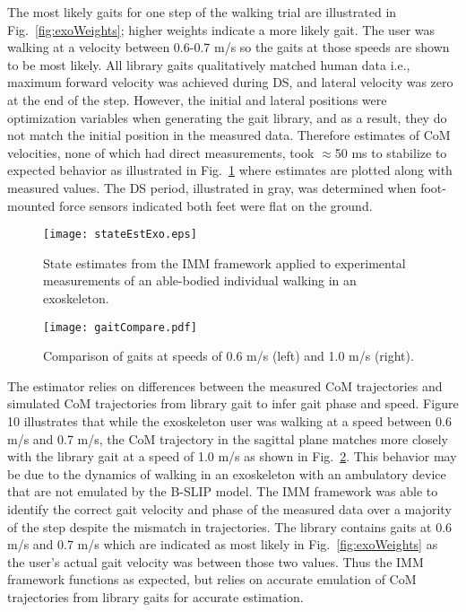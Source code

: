 The most likely gaits for one step of the walking trial are illustrated in Fig.~\ref{fig:exoWeights}; higher weights indicate a more likely gait. The user was walking at a velocity between 0.6-0.7 m/s so the gaits at those speeds are shown to be most likely. All library gaits qualitatively matched human data i.e., maximum forward velocity was achieved during DS, and lateral velocity was zero at the end of the step. However, the initial and lateral positions were optimization variables when generating the gait library, and as a result, they do not match the initial position in the measured data. Therefore estimates of CoM velocities, none of which had direct measurements, took $ \approx $50 ms to stabilize to expected behavior as illustrated in Fig.~\ref{fig:exoState} where estimates are plotted along with measured values. The DS period, illustrated in gray, was determined when foot-mounted force sensors indicated both feet were flat on the ground.
\begin{figure}
	\centering
	\texttt{[image: stateEstExo.eps]}
	\caption{State estimates from the IMM framework applied to experimental measurements of an able-bodied individual walking in an exoskeleton.}\label{fig:exoState}
\end{figure}

\begin{figure}
	\centering
	\texttt{[image: gaitCompare.pdf]}
	\caption{Comparison of gaits at speeds of 0.6 m/s  (left) and 1.0 m/s  (right).}\label{fig:compare}
\end{figure}

The estimator relies on differences between the measured CoM trajectories and simulated CoM trajectories from library gait to infer gait phase and speed. Figure 10 illustrates that while the exoskeleton user was walking at a speed between 0.6 m/s and 0.7 m/s, the CoM trajectory in the sagittal plane matches more closely with the library gait at a speed of 1.0 m/s as shown in Fig.~\ref{fig:compare}. This behavior may be due to the dynamics of walking in an exoskeleton with an ambulatory device that are not emulated by the B-SLIP model. The IMM framework was able to identify the correct gait velocity and phase of the measured data over a majority of the step despite the mismatch in trajectories. The library contains gaits at 0.6 m/s and 0.7 m/s which are indicated as most likely in Fig.~\ref{fig:exoWeights} as the user's actual gait velocity was between those two values. Thus the IMM framework functions as expected, but relies on accurate emulation of CoM trajectories from library gaits for accurate estimation.

